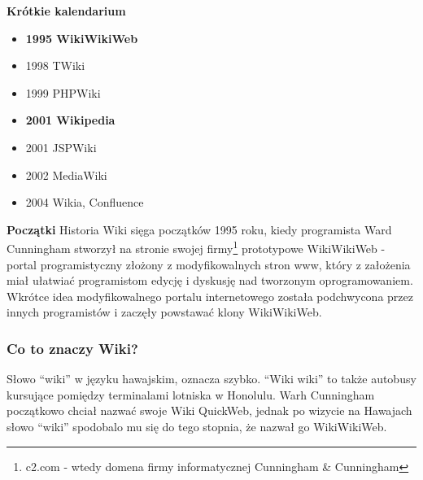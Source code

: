 \documentclass{article}
\begin{document}
	\textbf{Krótkie kalendarium}
	\begin{itemize}
		\item \textbf{1995 WikiWikiWeb}
		\item 1998 TWiki
		\item 1999 PHPWiki
		\item \textbf{2001 Wikipedia}
		\item 2001 JSPWiki
		\item 2002 MediaWiki
		\item 2004 Wikia, Confluence
	\end{itemize}
	\textbf{Początki}
	\newline
	Historia Wiki sięga początków 1995 roku, kiedy programista Ward Cunningham stworzył na stronie swojej firmy\footnote{c2.com - wtedy domena firmy informatycznej Cunningham \& Cunningham} prototypowe WikiWikiWeb - portal programistyczny złożony z modyfikowalnych stron www, który z założenia miał ułatwiać programistom edycję i dyskusję nad tworzonym oprogramowaniem. Wkrótce idea modyfikowalnego portalu internetowego została podchwycona przez innych programistów i zaczęły powstawać klony WikiWikiWeb. 
	\subsubsection{Co to znaczy Wiki?}
		Słowo ``wiki'' w języku hawajskim, oznacza szybko. ``Wiki wiki'' to także autobusy kursujące pomiędzy terminalami lotniska w Honolulu. Warh Cunningham początkowo chciał nazwać swoje Wiki QuickWeb, jednak po wizycie na Hawajach słowo ``wiki'' spodobalo mu się do tego stopnia, że nazwał go WikiWikiWeb.
\end{document}
